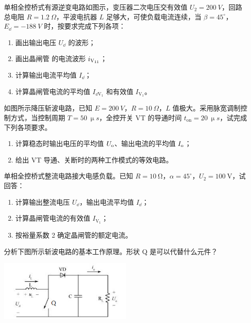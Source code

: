 \documentclass[电力电子]{subfiles}
\begin{document}
\begin{ti}
	单相全控桥式有源逆变电路如图示，变压器二次电压交有效值 $U_{2} = \SI{200}{V}$，回路总电阻 $R = \SI{1.2}{\Omega}$，平波电抗器 $L$ 足够大，可使负载电流连续，当 $\beta = 45^\circ$，$E_{\dd} = - \SI{188}{V}$ 时，按要求完成下列各项：
	\begin{enumerate}
		\item 画出输出电压 $U_{\dd}$ 的波形；
		\item 画出晶闸管 \V 的电流波形 $i_{\text{V\textsubscript{11}}}$；
		\item 计算输出电流平均值 $I_{\dd}$；
		\item 计算晶闸管电流的平均值 $I_{\dd \mathrm{V}_{1}}$ 和有效值 $I_{\mathrm{V}_{1}}$。
	\end{enumerate}
\end{ti}

\begin{ti}[10 分]
	如图所示降压斩波电路，已知 $E = \SI{200}{V}$，$R = \SI{10}{\Omega}$，$L$ 值极大。采用脉宽调制控制方式，当控制周期 $T = \SI{50}{\upmu s}$，全控开关 VT 的导通时间 $t_{\mathrm{on}} = \SI{20}{\upmu s}$，试完成下列各项要求。
	\begin{enumerate}
		\item 计算稳态时输出电压的平均值 $U_{\mathrm{o}}$、输出电流的平均值 $I_{\mathrm{o}}$；
		\item 给出 VT 导通、关断时的两种工作模式的等效电路。
	\end{enumerate}
\end{ti}

\begin{ti}[10 分]
	单相全控桥式整流电路接大电感负载。已知 $R = \SI{10}{\ohm}$，$\alpha = 45^\circ$，$U_{2} = \SI{100}{\volt}$，试回答：
	\begin{enumerate}
		\item 计算输出整流电压 $U_{\dd}$，输出电流平均值 $I_{\dd}$；
		\item 计算晶闸管电流的有效值 $I_{\mathrm{V}_{1}}$；
		\item 按裕量系数 2 确定晶闸管的额定电流。
	\end{enumerate}
\end{ti}

\begin{ti}[10 分]
	分析下图所示斩波电路的基本工作原理。形状 Q 是可以代替什么元件？
	\begin{center}
		\includegraphics[width=0.5\textwidth]{figure/fig7.png}
	\end{center}
\end{ti}
\end{document}
